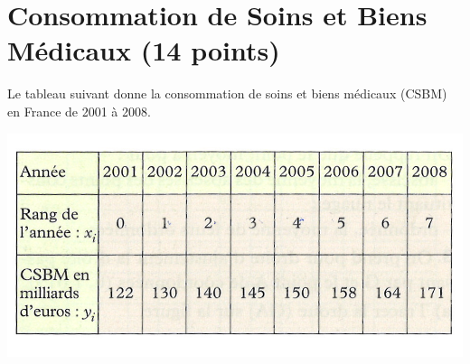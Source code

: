 \section{Consommation de Soins et Biens Médicaux (14 points)}

Le tableau suivant donne la consommation de soins et biens médicaux (CSBM) en France de 2001 à 2008.

\begin{center}
	\includegraphics[scale=1.2]{csbm}
\end{center}

